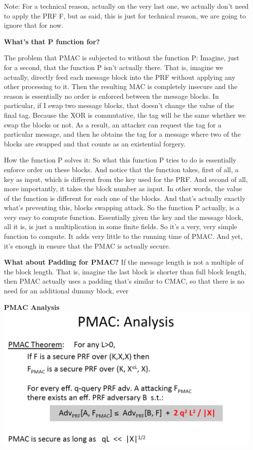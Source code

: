 \documentclass[11pt]{article}
\makeatletter
\def\maxwidth{\ifdim\Gin@nat@width>\linewidth\linewidth
    \else\Gin@nat@width\fi}
\let\Oldincludegraphics\includegraphics
\renewcommand{\includegraphics}[1]{\Oldincludegraphics[width=.8\maxwidth]{#1}}
\makeatother
\begin{document}
Note: For a technical reason, actually on the very last one, we actually
don't need to apply the PRF F, but as said, this is just for technical
reason, we are going to ignore that for now.

\textbf{What's that P function for?}

The problem that PMAC is subjected to without the function P: Imagine,
just for a second, that the function P isn't actually there. That is,
imagine we actually, directly feed each message block into the PRF
without applying any other processing to it. Then the resulting MAC is
completely insecure and the reason is essentially no order is enforced
between the message blocks. In particular, if I swap two message blocks,
that doesn't change the value of the final tag. Because the XOR is
commutative, the tag will be the same whether we swap the blocks or not.
As a result, an attacker can request the tag for a particular message,
and then he obtains the tag for a message where two of the blocks are
swapped and that counts as an existential forgery.

How the function P solves it: So what this function P tries to do is
essentially enforce order on these blocks. And notice that the function
takes, first of all, a key as input, which is different from the key
used for the PRF. And second of all, more importantly, it takes the
block number as input. In other words, the value of the function is
different for each one of the blocks. And that's actually exactly what's
preventing this, blocks swapping attack. So the function P actually, is
a very easy to compute function. Essentially given the key and the
message block, all it is, is just a multiplication in some finite
fields. So it's a very, very simple function to compute. It adds very
little to the running time of PMAC. And yet, it's enough in ensure that
the PMAC is actually secure.

\textbf{What about Padding for PMAC?} If the message length is not a
multiple of the block length. That is, imagine the last block is shorter
than full block length, then PMAC actually uses a padding that's similar
to CMAC, so that there is no need for an additional dummy block, ever

\textbf{PMAC Analysis} \includegraphics{./Images/PMAC-Analysis.png}
\end{document}
